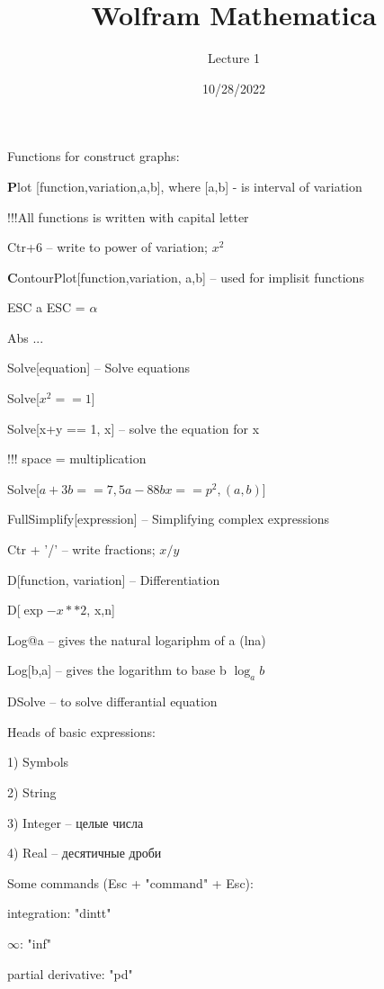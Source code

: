 \documentclass[a4paper,12pt]{article}
\author{Lecture 1}
\title{Wolfram Mathematica}
\date{10/28/2022}
\begin{document}

Functions for construct graphs:

\textbf Plot [function,{variation,a,b}], where [a,b] - is interval of variation

!!!All functions is written with capital letter

Ctr+6 -- write to power of variation; $x^2$

\textbf ContourPlot[function,{variation, a,b}] -- used for implisit functions

ESC a ESC = $\alpha$

Abs ...

Solve[equation] -- Solve equations

Solve[$x^2 == 1$]

Solve[x+y == 1, x] -- solve the equation for x

!!! space = multiplication

Solve[${a+3 b == 7, 5 a - 88 b x == p^2}, (a,b)$]

FullSimplify[expression] -- Simplifying complex expressions

Ctr + '/' -- write fractions; $x/y$

D[function, variation] -- Differentiation

D[$\exp{-x**2}$, {x,n}]

Log@a -- gives the natural logariphm of a (lna)

Log[b,a] -- gives the logarithm to base b $\log_{a}b$

DSolve -- to solve differantial equation

Heads of basic expressions:

1) Symbols

2) String

3) Integer -- целые числа

4) Real -- десятичные дроби

Some commands (Esc + "command" + Esc):

integration: "dintt"

$\infty$: "inf"

partial derivative: "pd"
\end{document}
